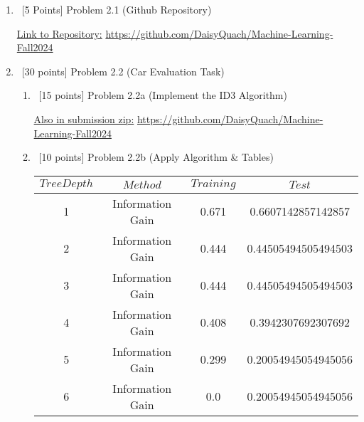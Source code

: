 \documentclass[8pt, fullpage,letterpaper]{article}
\begin{document}
\begin{enumerate}

	\item~[5 Points] Problem 2.1 (Github Repository)

	\color{violet}
	\underline{Link to Repository:} \url{https://github.com/DaisyQuach/Machine-Learning-Fall2024}\\

\color{black}
\item~[30 points] Problem 2.2 (Car Evaluation Task)

\begin{enumerate}

\item~[15 points] Problem 2.2a (Implement the ID3 Algorithm)

	\color{violet}
	\underline{Also in submission zip:} \url{https://github.com/DaisyQuach/Machine-Learning-Fall2024}\\ 

\color{black}
\item~[10 points] Problem 2.2b (Apply Algorithm \& Tables)

	\color{violet}
		\begin{center}
			\begin{tabular}{c|c|c|c}
				\hline
				$Tree Depth$ & $Method$ & $Training $ & $Test $ \\ 
				\hline\hline\hline
				1 & Information Gain 	& 0.671 & 0.6607142857142857  \\ \hline
				2 & Information Gain 	& 0.444 & 0.44505494505494503  \\ \hline
				3 & Information Gain 	& 0.444 & 0.44505494505494503  \\ \hline
				4 & Information Gain 	& 0.408 & 0.3942307692307692  \\ \hline
				5 & Information Gain 	& 0.299 & 0.20054945054945056  \\ \hline
				6 & Information Gain 	& 0.0 & 0.20054945054945056  \\ \hline\hline


\end{tabular}
\end{center}
\end{enumerate}
\end{enumerate}
\end{document}

